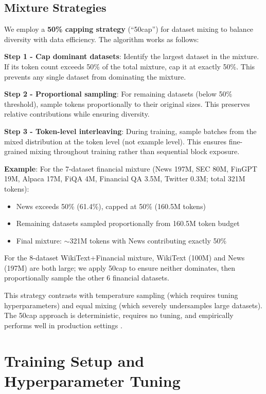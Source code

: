 \subsection{Mixture Strategies}

We employ a \textbf{50\% capping strategy} (``50cap'') for dataset mixing to balance diversity with data efficiency. The algorithm works as follows:

\textbf{Step 1 - Cap dominant datasets}: Identify the largest dataset in the mixture. If its token count exceeds 50\% of the total mixture, cap it at exactly 50\%. This prevents any single dataset from dominating the mixture.

\textbf{Step 2 - Proportional sampling}: For remaining datasets (below 50\% threshold), sample tokens proportionally to their original sizes. This preserves relative contributions while ensuring diversity.

\textbf{Step 3 - Token-level interleaving}: During training, sample batches from the mixed distribution at the token level (not example level). This ensures fine-grained mixing throughout training rather than sequential block exposure.

\textbf{Example}: For the 7-dataset financial mixture (News 197M, SEC 80M, FinGPT 19M, Alpaca 17M, FiQA 4M, Financial QA 3.5M, Twitter 0.3M; total 321M tokens):
\begin{itemize}
\item News exceeds 50\% (61.4\%), capped at 50\% (160.5M tokens)
\item Remaining datasets sampled proportionally from 160.5M token budget
\item Final mixture: $\sim$321M tokens with News contributing exactly 50\%
\end{itemize}

For the 8-dataset WikiText+Financial mixture, WikiText (100M) and News (197M) are both large; we apply 50cap to ensure neither dominates, then proportionally sample the other 6 financial datasets.

This strategy contrasts with temperature sampling (which requires tuning hyperparameters) and equal mixing (which severely undersamples large datasets). The 50cap approach is deterministic, requires no tuning, and empirically performs well in production settings \parencite{longpre2023pretrainer}.

\section{Training Setup and Hyperparameter Tuning}


